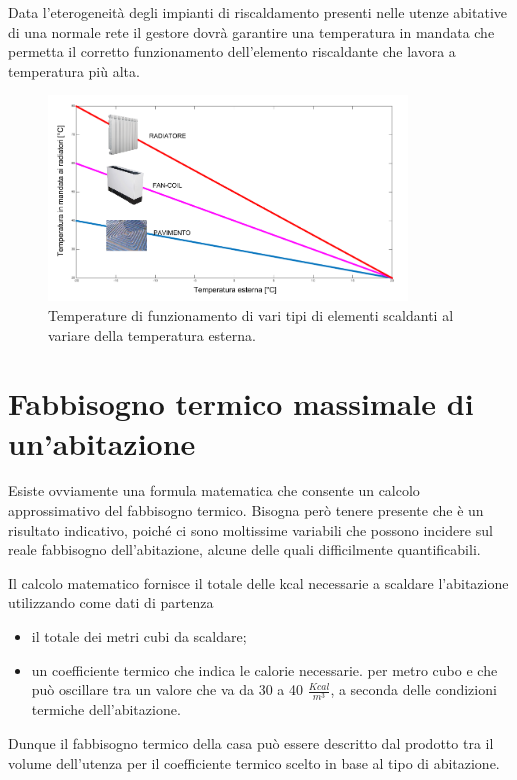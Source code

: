 \documentclass[laurea,oneside,11pt]{USiena_tesiLM}
\begin{document}
Data l'eterogeneità degli impianti di riscaldamento presenti nelle utenze abitative di una normale rete il gestore dovrà garantire una temperatura in mandata che permetta il corretto funzionamento dell'elemento riscaldante che lavora a temperatura più alta.

\begin{figure}[!ht]
\centering
\includegraphics[width=0.85\textwidth]{figure/elem_scaldanti} 
\caption{Temperature di funzionamento di vari tipi di elementi scaldanti al variare della temperatura esterna.}
\label{fig:elem_scaldanti}
\end{figure}

\section{Fabbisogno termico massimale di un'abitazione}
Esiste ovviamente una formula matematica che consente un calcolo approssimativo del fabbisogno termico. Bisogna però tenere presente che è  un risultato indicativo, poiché ci sono moltissime variabili che possono incidere sul reale fabbisogno dell'abitazione, alcune delle quali difficilmente quantificabili. 

Il calcolo matematico fornisce il totale delle kcal necessarie a scaldare l'abitazione utilizzando come dati di partenza
\begin{itemize}
\item  il totale dei metri cubi da scaldare;
\item  un coefficiente termico che indica le calorie necessarie. per metro cubo e che può  oscillare tra un valore che va da 30 a 40 $\frac{Kcal}{m^3}$, a seconda delle condizioni termiche dell'abitazione.
\end{itemize}
Dunque il fabbisogno termico della casa può essere descritto dal prodotto tra il volume dell'utenza per il coefficiente termico scelto in base al tipo di abitazione.
\end{document}
